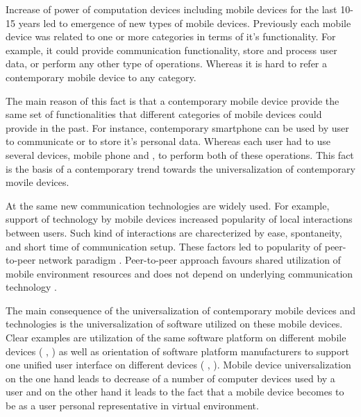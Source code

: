 %
Increase of power of computation devices including mobile devices for the last 10-15 years led to emergence of new types of mobile devices. 
%
Previously each mobile device was related to one or more categories in terms of it's functionality. 
%
For example, it could provide communication functionality, store and process user data, or perform any other type of operations. 
%
Whereas it is hard to refer a contemporary mobile device to any category. 

%
The main reason of this fact is that a contemporary mobile device provide the same set of functionalities that different categories of mobile devices could provide in the past. 
%
For instance, contemporary smartphone can be used by user to communicate or to store it's personal data. 
%
Whereas each user had to use several devices, mobile phone and , to perform both of these operations. 
%
This fact is the basis of a contemporary trend towards the universalization of contemporary movile devices. 

%
At the same new communication technologies are widely used. 
%
For example, support of   technology by mobile devices increased popularity of local interactions between users. 
%
Such kind of interactions are charecterized by ease, spontaneity, and short time of communication setup. 
%
These factors led to popularity of peer-to-peer network paradigm . 
%
Peer-to-peer approach favours shared utilization of mobile environment resources and does not depend on underlying communication technology  . 

%
The main consequence of the universalization of contemporary mobile devices and technologies is the universalization of software utilized on these mobile devices. 
%
Clear examples are utilization of the same software platform on different mobile devices ( ,  ) as well as orientation of software platform manufacturers to support one unified user interface on different devices ( ,  ). 
%
Mobile device universalization on the one hand leads to decrease of a number of computer devices used by a user and on the other hand it leads to the fact that a mobile device becomes to be as a user personal representative in virtual environment. 

